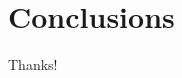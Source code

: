 \documentclass{beamer}
\begin{document}
\section{Conclusions}
    
\begin{frame}
    \begin{center}
        {\Huge\calligra Thanks!}
    \end{center}
\end{frame}
\end{document}
